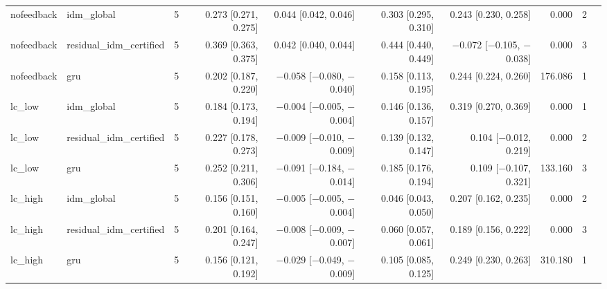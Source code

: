 \begin{table}[htbp]
{\begin{tabular}{llrrrrrrrl}
nofeedback & idm\_global & 5 & 0.273 [0.271, 0.275] & 0.044 [0.042, 0.046] & 0.303 [0.295, 0.310] & 0.243 [0.230, 0.258] & 0.000 & 2 &  \\
nofeedback & residual\_idm\_certified & 5 & 0.369 [0.363, 0.375] & 0.042 [0.040, 0.044] & 0.444 [0.440, 0.449] & $-$0.072 [$-$0.105, $-$0.038] & 0.000 & 3 &  \\
nofeedback & gru & 5 & 0.202 [0.187, 0.220] & $-$0.058 [$-$0.080, $-$0.040] & 0.158 [0.113, 0.195] & 0.244 [0.224, 0.260] & 176.086 & 1 &  \\
lc\_low & idm\_global & 5 & 0.184 [0.173, 0.194] & $-$0.004 [$-$0.005, $-$0.004] & 0.146 [0.136, 0.157] & 0.319 [0.270, 0.369] & 0.000 & 1 &  \\
lc\_low & residual\_idm\_certified & 5 & 0.227 [0.178, 0.273] & $-$0.009 [$-$0.010, $-$0.009] & 0.139 [0.132, 0.147] & 0.104 [$-$0.012, 0.219] & 0.000 & 2 &  \\
lc\_low & gru & 5 & 0.252 [0.211, 0.306] & $-$0.091 [$-$0.184, $-$0.014] & 0.185 [0.176, 0.194] & 0.109 [$-$0.107, 0.321] & 133.160 & 3 &  \\
lc\_high & idm\_global & 5 & 0.156 [0.151, 0.160] & $-$0.005 [$-$0.005, $-$0.004] & 0.046 [0.043, 0.050] & 0.207 [0.162, 0.235] & 0.000 & 2 &  \\
lc\_high & residual\_idm\_certified & 5 & 0.201 [0.164, 0.247] & $-$0.008 [$-$0.009, $-$0.007] & 0.060 [0.057, 0.061] & 0.189 [0.156, 0.222] & 0.000 & 3 &  \\
lc\_high & gru & 5 & 0.156 [0.121, 0.192] & $-$0.029 [$-$0.049, $-$0.009] & 0.105 [0.085, 0.125] & 0.249 [0.230, 0.263] & 310.180 & 1 &  \\
\bottomrule
\end{tabular}
}
\end{table}
